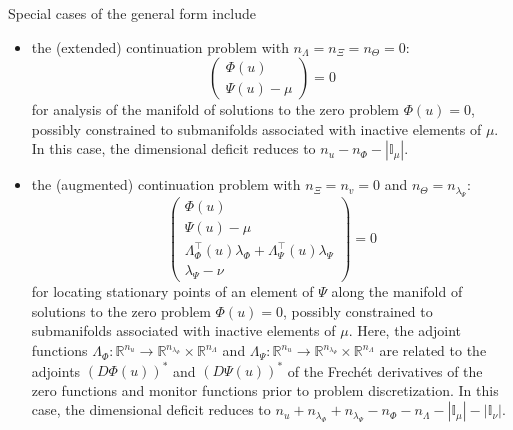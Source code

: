 Special cases of the general form include
\begin{itemize}
\item the (extended) continuation problem with $n_\Lambda=n_\Xi=n_\Theta=0$:
\begin{equation}
\label{eq:extended}
\left(\begin{array}{c}\Phi(u)\\\Psi(u)-\mu\end{array}\right)=0
\end{equation}
for analysis of the manifold of solutions to the zero problem $\Phi(u)=0$, possibly constrained to submanifolds associated with inactive elements of $\mu$. In this case, the dimensional deficit reduces to $n_u-n_\Phi-\left|\mathbb{I}_\mu\right|$.

\item the (augmented) continuation problem with $n_\Xi=n_v=0$ and $n_\Theta=n_{\lambda_\Psi}$:
\begin{equation}
\label{eq:stationary}
\left(\begin{array}{c}\Phi(u)\\\Psi(u)-\mu\\\Lambda_\Phi^\top(u)\lambda_\Phi+\Lambda_\Psi^\top(u)\lambda_\Psi\\\lambda_\Psi-\nu\end{array}\right)=0
\end{equation}
for locating stationary points of an element of $\Psi$ along the manifold of solutions to the zero problem $\Phi(u)=0$, possibly constrained to submanifolds associated with inactive elements of $\mu$. Here, the adjoint functions $\Lambda_\Phi:\mathbb{R}^{n_u}\rightarrow\mathbb{R}^{n_{\lambda_\Phi}}\times\mathbb{R}^{n_\Lambda}$ and $\Lambda_\Psi:\mathbb{R}^{n_u}\rightarrow\mathbb{R}^{n_{\lambda_\Psi}}\times\mathbb{R}^{n_\Lambda}$ are related to the adjoints $\left(D\Phi(u)\right)^\ast$ and $\left(D\Psi(u)\right)^\ast$ of the Frech\'{e}t derivatives of the zero functions and monitor functions prior to problem discretization. In this case, the dimensional deficit reduces to $n_u+n_{\lambda_\Phi}+n_{\lambda_\Psi}-n_\Phi-n_\Lambda-\left|\mathbb{I}_\mu\right|-\left|\mathbb{I}_\nu\right|$.


\end{itemize}
